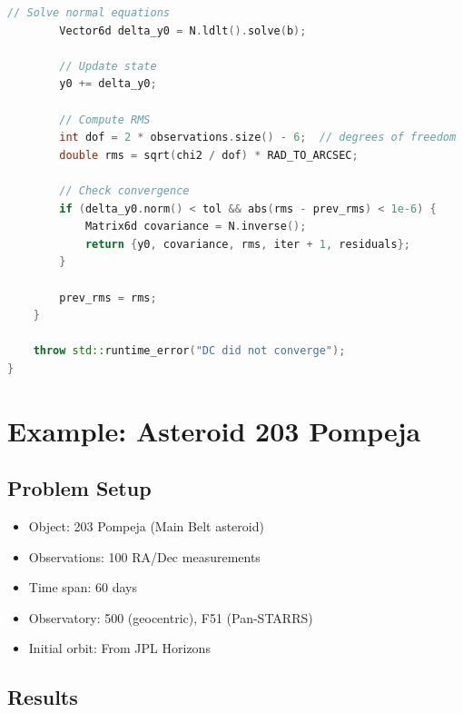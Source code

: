 \begin{lstlisting}[language=C++,caption={Differential correction implementation}]
        // Solve normal equations
        Vector6d delta_y0 = N.ldlt().solve(b);
        
        // Update state
        y0 += delta_y0;
        
        // Compute RMS
        int dof = 2 * observations.size() - 6;  // degrees of freedom
        double rms = sqrt(chi2 / dof) * RAD_TO_ARCSEC;
        
        // Check convergence
        if (delta_y0.norm() < tol && abs(rms - prev_rms) < 1e-6) {
            Matrix6d covariance = N.inverse();
            return {y0, covariance, rms, iter + 1, residuals};
        }
        
        prev_rms = rms;
    }
    
    throw std::runtime_error("DC did not converge");
}
\end{lstlisting}

\section{Example: Asteroid 203 Pompeja}

\subsection{Problem Setup}

\begin{itemize}
    \item Object: 203 Pompeja (Main Belt asteroid)
    \item Observations: 100 RA/Dec measurements
    \item Time span: 60 days
    \item Observatory: 500 (geocentric), F51 (Pan-STARRS)
    \item Initial orbit: From JPL Horizons
\end{itemize}

\subsection{Results}

